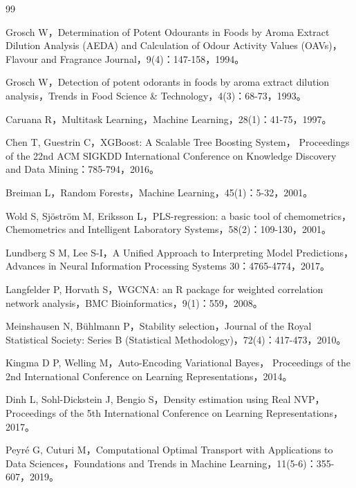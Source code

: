 \begin{thebibliography}{99}
\setlength{\itemsep}{1pt}
\small

 Grosch W，Determination of Potent Odourants in Foods by Aroma
Extract Dilution Analysis (AEDA) and Calculation of Odour Activity Values (OAVs)，
Flavour and Fragrance Journal，9(4)：147-158，1994。

 Grosch W，Detection of potent odorants in foods by aroma extract
dilution analysis，Trends in Food Science \& Technology，4(3)：68-73，1993。

 Caruana R，Multitask Learning，Machine Learning，28(1)：41-75，1997。

 Chen T, Guestrin C，XGBoost: A Scalable Tree Boosting System，
Proceedings of the 22nd ACM SIGKDD International Conference on Knowledge Discovery and
Data Mining：785-794，2016。

 Breiman L，Random Forests，Machine Learning，45(1)：5-32，2001。

 Wold S, Sjöström M, Eriksson L，PLS-regression: a basic tool of
chemometrics，Chemometrics and Intelligent Laboratory Systems，58(2)：109-130，2001。

 Lundberg S M, Lee S-I，A Unified Approach to Interpreting Model
Predictions，Advances in Neural Information Processing Systems 30：4765-4774，2017。

 Langfelder P, Horvath S，WGCNA: an R package for weighted
correlation network analysis，BMC Bioinformatics，9(1)：559，2008。

 Meinshausen N, Bühlmann P，Stability selection，Journal of the
Royal Statistical Society: Series B (Statistical Methodology)，72(4)：417-473，2010。

 Kingma D P, Welling M，Auto-Encoding Variational Bayes，
Proceedings of the 2nd International Conference on Learning Representations，2014。

 Dinh L, Sohl-Dickstein J, Bengio S，Density estimation using Real NVP，
Proceedings of the 5th International Conference on Learning Representations，2017。

 Peyré G, Cuturi M，Computational Optimal Transport with Applications
to Data Sciences，Foundations and Trends in Machine Learning，11(5-6)：355-607，2019。


\end{thebibliography}
